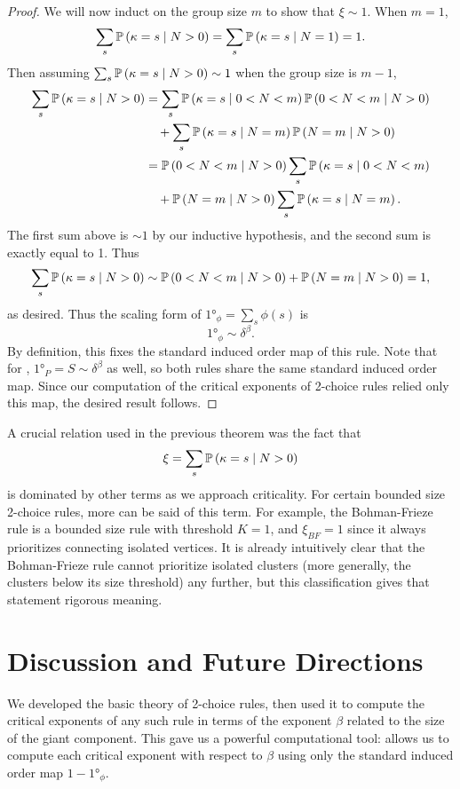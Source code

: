 \documentclass[twoside,10pt]{article}
\newcommand{\BF}{Bohman-Frieze\xspace}
\begin{document}
\begin{proof}
	We will now induct on the group size $m$ to show that $\xi \sim 1$. When $m=1$,
	\[
	\sum_{s} \P{ \kappa=s\;|\; N>0 } = \sum_{s}\P{ \kappa=s\;|\; N=1 } = 1.
	\] Then assuming $\sum_{s} \P{ \kappa=s\;|\; N>0 } \sim 1$ when the group size is $m-1$,
	\begin{align*}
		\sum_{s}\P{ \kappa=s\;|\; N>0 } &= \sum_{s}\P{ \kappa=s\;|\; 0<N<m }\P{ 0<N<m\;|\;N>0 } \\
							 &\quad + \sum_{s} \P{ \kappa=s\;|\; N=m }\P{ N=m\;|\;N>0 } \\
							 &= \P{ 0<N<m\;|\; N>0 } \sum_{s} \P{ \kappa=s\;|\; 0<N<m } \\
							 &\quad + \P{ N=m\;|\;N>0 }\sum_{s}\P{ \kappa=s\;|\; N=m }.
	\end{align*}
	The first sum above is $\sim 1$ by our inductive hypothesis, and the second sum is exactly equal to 1. Thus
	\[
		\sum_{s}\P{ \kappa=s\;|\; N>0 } \sim \P{ 0<N<m\;|\; N>0 } + \P{ N=m\;|\;N>0 } = 1,
	\]
	as desired. Thus the scaling form of $\ang{1}_{\phi}=\sum_{s}\phi(s)$ is
	\[
	\ang{1}_{\phi} \sim \delta^{\beta}.
	\] 
	By definition, this fixes the standard induced order map of this rule. 	Note that for \ER, $\ang{1}_{P} = S \sim \delta^{\beta}$ as well, so both rules share the same standard induced order map. Since our computation of the critical exponents of 2-choice rules relied only this map, the desired result follows.
\end{proof}

A crucial relation used in the previous theorem was the fact that
\[
\xi = \sum_{s} \P{ \kappa=s\;|\; N>0 }
\] is dominated by other terms as we approach criticality. For certain bounded size 2-choice rules, more can be said of this term. For example, the \BF rule is a bounded size rule with threshold $K=1$, and $\xi_{BF}= 1$ since it always prioritizes connecting isolated vertices. It is already intuitively clear that the \BF rule cannot prioritize isolated clusters (more generally, the clusters below its size threshold) any further, but this classification gives that statement rigorous meaning.


\section{Discussion and Future Directions}

We developed the basic theory of 2-choice rules, then used it to compute the critical exponents of any such rule in terms of the exponent $\beta$ related to the size of the giant component. This gave us a powerful computational tool:  allows us to compute each critical exponent with respect to $\beta$ using only the standard induced order map $1 - \ang{1}_{\phi}$.
\end{document}
